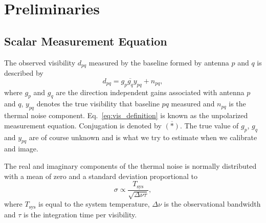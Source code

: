 \documentclass[useAMS,usenatbib]{mn2e}
\newcommand{\conj}[1]{\overline{#1}}
\begin{document}
%  
 
\section{Preliminaries}

\subsection{Scalar Measurement Equation}
The observed visibility $d_{pq}$ measured by the baseline formed by antenna $p$ and $q$ is described by
\begin{equation}
\label{eq:vis_definition}
d_{pq} = g_{p}\conj{g_q}y_{pq} + n_{pq},
\end{equation}
where $g_{p}$ and $g_{q}$ are the direction independent gains associated with antenna $p$ and $q$, $y_{pq}$ denotes the true visibility that baseline $pq$ measured
and $n_{pq}$ is the thermal noise component. Eq.~\eqref{eq:vis_definition} is known as the unpolarized measurement equation. Conjugation is denoted by $\conj{(*)}$. The true value of $g_p$, $g_q$ and $y_{pq}$ are of course unknown and is what we try to estimate when we calibrate 
and image.

The real and imaginary components of the thermal noise is normally distributed with a mean of zero and a standard deviation proportional to   
\begin{equation}
\sigma \propto \frac{T_{\textrm{sys}}}{\sqrt{\Delta \nu \tau}}, 
\end{equation}
where $T_{\textrm{sys}}$ is equal to the system temperature, $\Delta \nu$ is the observational bandwidth and $\tau$ is the integration time per visibility. 
\end{document}
